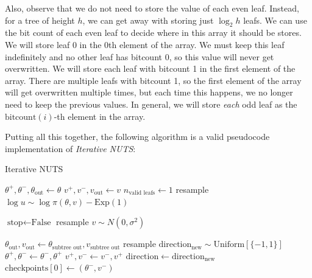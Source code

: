 \documentclass[12pt]{article}
\begin{document}
{Also, observe that we do not need to store the value of each even leaf. Instead, for a tree of height $h$, we can get away with storing just $\log_2 h$ leafs. We can use the bit count of each even leaf to decide where in this array it should be stores. We will store leaf 0 in the 0th element of the array. We must keep this leaf indefinitely and no other leaf has bitcount 0, so this value will never get overwritten. We will store each leaf with bitcount 1 in the first element of the array. There are multiple leafs with bitcount 1, so the first element of the array will get overwritten multiple times, but each time this happens, we no longer need to keep the previous values. In general, we will store \textit{each} odd leaf as the $\text{bitcount}(i)$-th element in the array.

Putting all this together, the following algorithm is a valid pseudocode implementation of \textit{Iterative NUTS}:

\begin{algorithm}%
\small
\caption{Iterative NUTS}
\label{alg_nuts}
\begin{algorithmic}
 
	\State $\theta^+, \theta^-, \theta_\textrm{out} \gets \theta $ 
	\State $v^+, v^-, v_\textrm{out} \gets v $
	\State $n_\textrm{valid leafs} \gets 1$ 
	\State resample $\log u \sim \log \pi(\theta, v) - \textrm{Exp}(1)$ 
	
	\State $\textrm{stop} \gets \textrm{False}$ 
	\State resample $v \sim N(0, \sigma^2)$ 
	 
		
		 
			\State $\theta_\textrm{out}, v_\textrm{out} \gets \theta_\textrm{subtree out}, v_\textrm{subtree out}$ 
			\State resample $\textrm{direction}_\textrm{new} \sim \textrm{Uniform}[\{-1, 1\}]$ 
			 
				\State $\theta^+, \theta^- \gets \theta^-, \theta^+$
				\State $v^+, v^- \gets v^-, v^+$
			\EndIf
			\State $\textrm{direction} \gets \textrm{direction}_\textrm{new}$
			\State $\textrm{checkpoints}[0] \gets (\theta^-, v^-)$ 
		\EndIf
		

\end{algorithmic}
\end{algorithm}}
\end{document}
